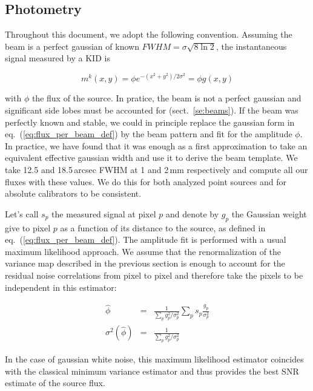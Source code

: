 \subsection{Photometry}
\label{se:intro_photometry}

Throughout this document, we adopt the following convention. Assuming the beam
is a perfect gaussian of known $FWHM=\sigma\sqrt{8\ln 2}$, the instantaneous
signal measured by a KID is

\begin{equation}
m^k(x,y) = \phi e^{-(x^2+y^2)/2\sigma^2} = \phi g(x,y)
\label{eq:flux_per_beam_def}
\end{equation}

with $\phi$ the flux of the source. In pratice, the beam is not a perfect
gaussian and significant side lobes must be accounted for
(sect.~\ref{se:beams}). If the beam was perfectly known and stable, we could in
principle replace the gaussian form in eq.~(\ref{eq:flux_per_beam_def}) by the
beam pattern and fit for the amplitude $\phi$. In practice, we have found that
it was enough as a first approximation to take an equivalent effective gaussian
width and use it to derive the beam template. We take 12.5 and 18.5\,arcsec FWHM
at 1 and 2\,mm respectively and compute all our fluxes with these
values. We do this for both analyzed point sources and for absolute calibrators
to be consistent.

Let's call $s_p$ the measured signal at pixel $p$ and denote by $g_p$ the
Gaussian weight give to pixel $p$ as a function of its distance to the source,
as defined in eq.~(\ref{eq:flux_per_beam_def}). The amplitude fit is performed
with a usual maximum likelihood approach. We assume that the renormalization of
the variance map described in the previous section is enough to account for the
residual noise correlations from pixel to pixel and therefore take the pixels to
be independent in this estimator:

\begin{eqnarray}
\hat{\phi} &=& \frac{1}{\sum_p g_p^2/\sigma_p^2}\sum_p
s_p\frac{g_p}{\sigma_p^2} \label{eq:flux_estim_def} \\
\sigma^2(\hat{\phi}) &=& \frac{1}{\sum_p
  g_p^2/\sigma_p^2} \label{eq:flux_estim_var_def}
\end{eqnarray}

In the case of gaussian white noise, this maximum likelihood estimator coincides
with the classical minimum variance estimator and thus provides the best SNR
estimate of the source flux.

